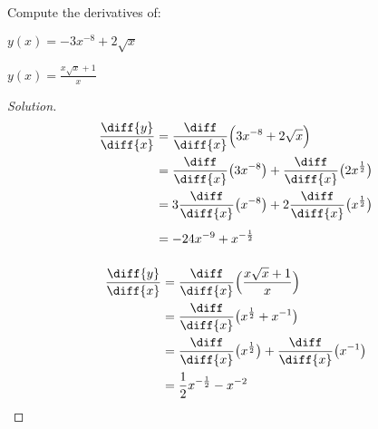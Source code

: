 \documentclass[crop=false,class=book,oneside]{standalone}                      %
\begin{document}
            \begin{problem}
                Compute the derivatives of:
                \begin{enumerate}[label=(\alph*)]
                    \begin{multicols}{2}
                        \item $y(x)=-3x^{-8}+2\sqrt{x}$
                        \item $y(x)=\frac{x\sqrt{x}+1}{x}$
                    \end{multicols}
                \end{enumerate}
            \end{problem}
            \begin{proof}[Solution]
                \par\hfill\par
                \begin{minipage}[b]{.49\textwidth}
                    \centering
                    \begin{align*}
                        \frac{\diff{y}}{\diff{x}}
                        &=\frac{\diff}{\diff{x}}
                            \Big(3x^{-8}+2\sqrt{x}\Big)\\
                        &=\frac{\diff}{\diff{x}}
                            \big(3x^{-8}\big)
                        +\frac{\diff}{\diff{x}}
                            \big(2x^{\frac{1}{2}}\big)\\
                        &=3\frac{\diff}{\diff{x}}
                            \big(x^{-8}\big)+
                            2\frac{\diff}{\diff{x}}
                            \big(x^{\frac{1}{2}}\big)\\
                        &=-24x^{-9}+x^{-\frac{1}{2}}
                        \vphantom{\frac{\diff}{\diff}}
                    \end{align*}
                \end{minipage}
                \hfill
                \vline
                \begin{minipage}[b]{.49\textwidth}
                    \centering
                    \begin{align*}
                        \frac{\diff{y}}{\diff{x}}
                        &=\frac{\diff}{\diff{x}}
                            \Big(\frac{x\sqrt{x}+1}{x}\Big)\\
                        &=\frac{\diff}{\diff{x}}
                            \big(x^{\frac{1}{2}}+x^{-1}\big)\\
                        &=\frac{\diff}{\diff{x}}
                            \big(x^{\frac{1}{2}}\big)
                            +\frac{\diff}{\diff{x}}
                            \big(x^{-1}\big)\\
                        &=\frac{1}{2}x^{-\frac{1}{2}}-x^{-2}
                            \vphantom{\frac{\diff}{\diff}}
                    \end{align*}
                \end{minipage}
            \end{proof}
\end{document}
